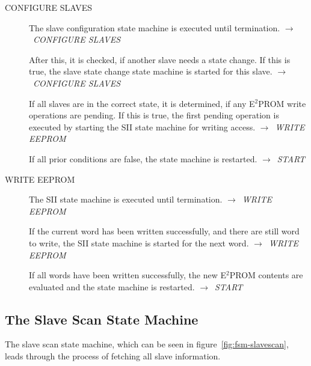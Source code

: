 \documentclass[a4paper,12pt,BCOR6mm,bibtotoc,idxtotoc]{scrbook}
\begin{document}
\begin{description}
\item[CONFIGURE SLAVES] The slave configuration state machine is
  executed until termination. $\rightarrow$~\textit{CONFIGURE SLAVES}

  After this, it is checked, if another slave needs a state change. If
  this is true, the slave state change state machine is started for
  this slave. $\rightarrow$~\textit{CONFIGURE SLAVES}

  If all slaves are in the correct state, it is determined, if any
  E$^2$PROM write operations are pending. If this is true, the first
  pending operation is executed by starting the SII state machine for
  writing access. $\rightarrow$~\textit{WRITE EEPROM}

  If all prior conditions are false, the state machine is restarted.
  $\rightarrow$~\textit{START}

\item[WRITE EEPROM] The SII state machine is executed until
  termination. $\rightarrow$~\textit{WRITE EEPROM}

  If the current word has been written successfully, and there are
  still word to write, the SII state machine is started for the next
  word. $\rightarrow$~\textit{WRITE EEPROM}

  If all words have been written successfully, the new E$^2$PROM
  contents are evaluated and the state machine is restarted.
  $\rightarrow$~\textit{START}

\end{description}


\subsection{The Slave Scan State Machine}
\label{sec:fsm-scan}

The slave scan state machine, which can be seen in
figure~\ref{fig:fsm-slavescan}, leads through the process of fetching
all slave information.
\end{document}
